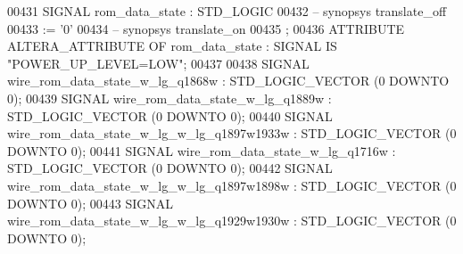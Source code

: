 \begin{DoxyCode}
{00431      \textcolor{keywordflow}{SIGNAL}  \textcolor{vhdlchar}{rom_data_state} \textcolor{vhdlchar}{:}   \textcolor{comment}{STD\_LOGIC}
00432 \textcolor{keyword}{     -- synopsys translate\_off}
00433       \textcolor{vhdlchar}{:=} \textcolor{vhdlchar}{'}\textcolor{vhdllogic}{}\textcolor{vhdllogic}{0}\textcolor{vhdlchar}{'}
00434 \textcolor{keyword}{     -- synopsys translate\_on}
00435      ;
00436      \textcolor{keywordflow}{ATTRIBUTE} \textcolor{vhdlchar}{ALTERA_ATTRIBUTE} \textcolor{keywordflow}{OF} \textcolor{vhdlchar}{rom_data_state} \textcolor{vhdlchar}{:} \textcolor{keywordflow}{SIGNAL} \textcolor{keywordflow}{IS} \textcolor{keyword}{"POWER\_UP\_LEVEL=LOW"};
00437 
00438      \textcolor{keywordflow}{SIGNAL}  \textcolor{vhdlchar}{wire_rom_data_state_w_lg_q1868w}    \textcolor{vhdlchar}{:}   \textcolor{comment}{STD\_LOGIC\_VECTOR} \textcolor{vhdlchar}{(}\textcolor{vhdllogic}{}\textcolor{vhdllogic}{0} \textcolor{keywordflow}{DOWNTO} \textcolor{vhdllogic}{}\textcolor{vhdllogic}{0}\textcolor{vhdlchar}{)};
00439      \textcolor{keywordflow}{SIGNAL}  \textcolor{vhdlchar}{wire_rom_data_state_w_lg_q1889w}    \textcolor{vhdlchar}{:}   \textcolor{comment}{STD\_LOGIC\_VECTOR} \textcolor{vhdlchar}{(}\textcolor{vhdllogic}{}\textcolor{vhdllogic}{0} \textcolor{keywordflow}{DOWNTO} \textcolor{vhdllogic}{}\textcolor{vhdllogic}{0}\textcolor{vhdlchar}{)};
00440      \textcolor{keywordflow}{SIGNAL}  \textcolor{vhdlchar}{wire_rom_data_state_w_lg_w_lg_q1897w1933w}  \textcolor{vhdlchar}{:}   \textcolor{comment}{STD\_LOGIC\_VECTOR} \textcolor{vhdlchar}{(}\textcolor{vhdllogic}{}\textcolor{vhdllogic}{0} \textcolor{keywordflow}{DOWNTO} \textcolor{vhdllogic}{}\textcolor{vhdllogic}{0}\textcolor{vhdlchar}{)};
00441      \textcolor{keywordflow}{SIGNAL}  \textcolor{vhdlchar}{wire_rom_data_state_w_lg_q1716w}    \textcolor{vhdlchar}{:}   \textcolor{comment}{STD\_LOGIC\_VECTOR} \textcolor{vhdlchar}{(}\textcolor{vhdllogic}{}\textcolor{vhdllogic}{0} \textcolor{keywordflow}{DOWNTO} \textcolor{vhdllogic}{}\textcolor{vhdllogic}{0}\textcolor{vhdlchar}{)};
00442      \textcolor{keywordflow}{SIGNAL}  \textcolor{vhdlchar}{wire_rom_data_state_w_lg_w_lg_q1897w1898w}  \textcolor{vhdlchar}{:}   \textcolor{comment}{STD\_LOGIC\_VECTOR} \textcolor{vhdlchar}{(}\textcolor{vhdllogic}{}\textcolor{vhdllogic}{0} \textcolor{keywordflow}{DOWNTO} \textcolor{vhdllogic}{}\textcolor{vhdllogic}{0}\textcolor{vhdlchar}{)};
00443      \textcolor{keywordflow}{SIGNAL}  \textcolor{vhdlchar}{wire_rom_data_state_w_lg_w_lg_q1929w1930w}  \textcolor{vhdlchar}{:}   \textcolor{comment}{STD\_LOGIC\_VECTOR} \textcolor{vhdlchar}{(}\textcolor{vhdllogic}{}\textcolor{vhdllogic}{0} \textcolor{keywordflow}{DOWNTO} \textcolor{vhdllogic}{}\textcolor{vhdllogic}{0}\textcolor{vhdlchar}{)};
}
\end{DoxyCode}
